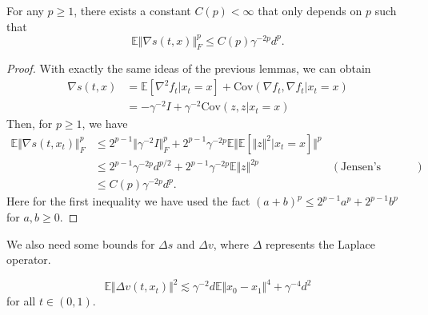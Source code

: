 \begin{lemma}
    For any $p\ge1$, there exists a constant $C(p)<\infty$ that only depends on $p$ such that
    $$\mathbb{E}\Vert\nabla s(t,x)\Vert_F^{p}\le C(p)\gamma^{-2p}d^p.$$
    \label{lem:s-space}
\end{lemma}
\begin{proof}
    With exactly the same ideas of the previous lemmas, we can obtain
    $$\begin{aligned}
        \nabla s(t,x)&=\mathbb{E}[\nabla^2f_t|x_t=x]+\text{Cov}(\nabla f_t,\nabla f_t|x_t=x)\\
        &=-\gamma^{-2}I+\gamma^{-2}\text{Cov}(z,z|x_t=x)
    \end{aligned}$$
    Then, for $p\ge1$, we have
    $$\begin{aligned}
        \mathbb{E}\Vert\nabla s(t,x_t)\Vert_F^{p}&\le2^{p-1}\Vert\gamma^{-2}I\Vert_F^p+2^{p-1}\gamma^{-2p}\mathbb{E}\Vert\mathbb{E}[\Vert z\Vert^2|x_t=x]\Vert^p\\
        &\le 2^{p-1}\gamma^{-2p}d^{p/2}+2^{p-1}\gamma^{-2p}\mathbb{E}\Vert z\Vert^{2p}&(\text{Jensen's inequality})\\
        &\le C(p)\gamma^{-2p}d^p.
    \end{aligned}$$
    Here for the first inequality we have used the fact $(a+b)^p\le 2^{p-1}a^p+2^{p-1}b^p$ for $a,b\ge0$.
\end{proof}

We also need some bounds for $\Delta s$ and $\Delta v$, where $\Delta$ represents the Laplace operator.

\begin{lemma}
    $$\mathbb{E}\Vert\Delta v(t,x_t)\Vert^2\lesssim\gamma^{-2}d\mathbb{E}\Vert x_0-x_1\Vert^4+\gamma^{-4}d^2$$
    for all $t\in(0,1)$.
    \label{lem:v-laplace}
\end{lemma}

